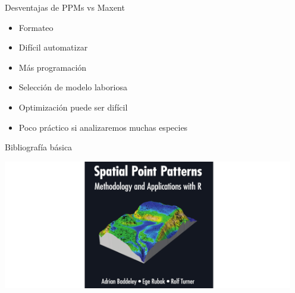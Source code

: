 \documentclass[
  11pt,
  ignorenonframetext,
]{beamer}
\providecommand{\tightlist}{%
  \setlength{\itemsep}{0pt}\setlength{\parskip}{0pt}}
\begin{document}
\begin{frame}{Desventajas de PPMs vs Maxent}
\protect\hypertarget{desventajas-de-ppms-vs-maxent}{}
\begin{itemize}
\tightlist
\item
  Formateo
\item
  Difícil automatizar
\item
  Más programación
\item
  Selección de modelo laboriosa
\item
  Optimización puede ser difícil
\item
  Poco práctico si analizaremos muchas especies
\end{itemize}
\end{frame}

\begin{frame}{Bibliografía básica}
\protect\hypertarget{bibliografuxeda-buxe1sica}{}
\begin{center}\includegraphics[width=5in]{Figuras/Spat-book} \end{center}
\end{frame}
\end{document}
